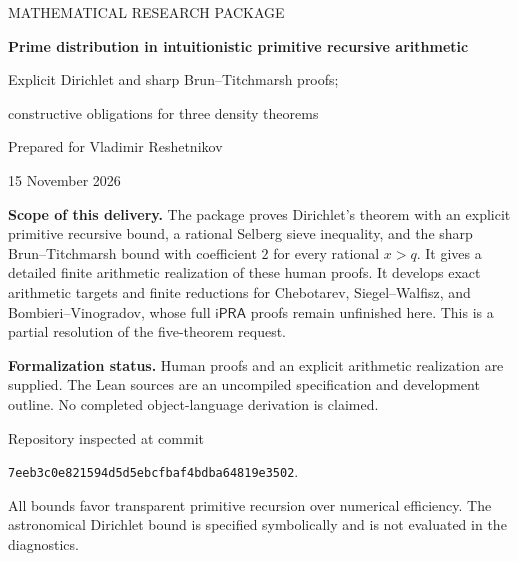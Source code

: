 \documentclass[11pt,a4paper]{article}
\theoremstyle{definition}
\newcommand{\ipra}{\mathsf{iPRA}}
\begin{document}
\begin{titlepage}
\vspace*{12mm}
{\Large\sffamily MATHEMATICAL RESEARCH PACKAGE\par}
\vspace{10mm}
{\Huge\bfseries Prime distribution in intuitionistic primitive recursive arithmetic\par}
\vspace{8mm}
{\Large Explicit Dirichlet and sharp Brun--Titchmarsh proofs;\par constructive obligations for three density theorems\par}
\vspace{14mm}
{\large Prepared for Vladimir Reshetnikov\par}
{\large 15 November 2026\par}
\vspace{12mm}
\noindent\begin{minipage}{\textwidth}
\textbf{Scope of this delivery.} The package proves Dirichlet's theorem with an explicit primitive recursive bound, a rational Selberg sieve inequality, and the sharp Brun--Titchmarsh bound with coefficient $2$ for every rational $x>q$. It gives a detailed finite arithmetic realization of these human proofs. It develops exact arithmetic targets and finite reductions for Chebotarev, Siegel--Walfisz, and Bombieri--Vinogradov, whose full $\ipra$ proofs remain unfinished here. This is a partial resolution of the five-theorem request.

\medskip
\textbf{Formalization status.} Human proofs and an explicit arithmetic realization are supplied. The Lean sources are an uncompiled specification and development outline. No completed object-language derivation is claimed.
\end{minipage}
\vfill
\noindent\small Repository inspected at commit\par
\texttt{7eeb3c0e821594d5d5ebcfbaf4bdba64819e3502}.\par
\medskip
\noindent\small All bounds favor transparent primitive recursion over numerical efficiency. The astronomical Dirichlet bound is specified symbolically and is not evaluated in the diagnostics.
\end{titlepage}
\tableofcontents
\newpage











\end{document}
